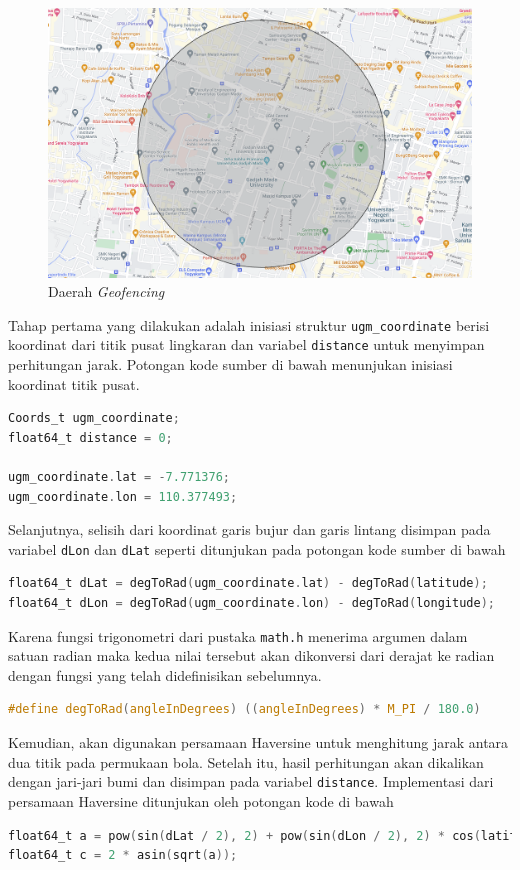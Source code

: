 \begin{figure}[H]
	\centering
	\includegraphics[width=12cm]{contents/chapter-3/geofence-map.png}
	\caption{Daerah \textit{Geofencing}}
	\label{Fig: geofence-map}
\end{figure}

Tahap pertama yang dilakukan adalah inisiasi struktur \texttt{ugm\_coordinate} berisi koordinat dari titik pusat lingkaran dan variabel \texttt{distance} untuk menyimpan perhitungan jarak. Potongan kode sumber di bawah menunjukan inisiasi koordinat titik pusat.
\begin{lstlisting}[language=c]
Coords_t ugm_coordinate;
float64_t distance = 0;

ugm_coordinate.lat = -7.771376;
ugm_coordinate.lon = 110.377493;
\end{lstlisting}

Selanjutnya, selisih dari koordinat garis bujur dan garis lintang disimpan pada variabel \texttt{dLon} dan \texttt{dLat} seperti ditunjukan pada potongan kode sumber di bawah
\begin{lstlisting}[language=c]
float64_t dLat = degToRad(ugm_coordinate.lat) - degToRad(latitude);
float64_t dLon = degToRad(ugm_coordinate.lon) - degToRad(longitude);
\end{lstlisting}
Karena fungsi trigonometri dari pustaka \texttt{math.h} menerima argumen dalam satuan radian maka kedua nilai tersebut akan dikonversi dari derajat ke radian dengan fungsi yang telah didefinisikan sebelumnya.
\begin{lstlisting}[language=c]
#define degToRad(angleInDegrees) ((angleInDegrees) * M_PI / 180.0)
\end{lstlisting}

Kemudian, akan digunakan persamaan Haversine untuk menghitung jarak antara dua titik pada permukaan bola. Setelah itu, hasil perhitungan akan dikalikan dengan jari-jari bumi dan disimpan pada variabel \texttt{distance}. Implementasi dari persamaan Haversine ditunjukan oleh potongan kode di bawah
\begin{lstlisting}[language=c]
float64_t a = pow(sin(dLat / 2), 2) + pow(sin(dLon / 2), 2) * cos(latitude) * cos(longitude);
float64_t c = 2 * asin(sqrt(a));
\end{lstlisting}

